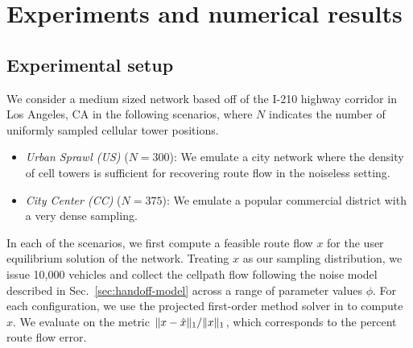 
\section{Experiments and numerical results}

\subsection{Experimental setup}

We consider a medium sized network based off of the I-210 highway corridor in Los Angeles, CA in the following scenarios, where $N$ indicates the number of uniformly sampled cellular tower positions. 
\begin{itemize}
\item \textit{Urban Sprawl (US)} ($N=300$): We emulate a city network where the density of cell towers is sufficient for recovering route flow in the noiseless setting.
\item \textit{City Center (CC)} ($N=375$): We emulate a popular commercial district with a very dense sampling.
\end{itemize}
In each of the scenarios, we first compute a feasible route flow $x$ for the user equilibrium solution of the network. Treating $x$ as our sampling distribution, we issue 10,000 vehicles and collect the cellpath flow following the noise model described in Sec.~\ref{sec:handoff-model} across a range of parameter values $\phi$. 
For each configuration, we use the projected first-order method solver in \cite{Wu2015} to compute $\hat x$. We evaluate on the metric $\lVert x-\hat x\rVert_1/\lVert x\rVert_1$, which corresponds to the percent route flow error.

